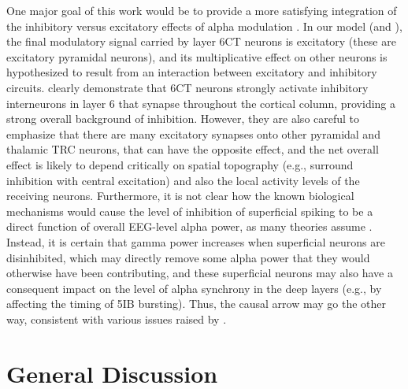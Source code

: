 \documentclass[11pt,twoside]{article}
\newif\myifpdf
\begin{document}
One major goal of this work would be to provide a more satisfying integration of the inhibitory versus excitatory effects of alpha modulation \cite{PalvaPalva11,PalvaPalva07,GulbinaiteIlhanVanRullen17}.  In our model (and ), the final modulatory signal carried by layer 6CT neurons is excitatory (these are excitatory pyramidal neurons), and its multiplicative effect on other neurons is hypothesized to result from an interaction between excitatory and inhibitory circuits.   clearly demonstrate that 6CT neurons strongly activate inhibitory interneurons in layer 6 that synapse throughout the cortical column, providing a strong overall background of inhibition.  However, they are also careful to emphasize that there are many excitatory synapses onto other pyramidal and thalamic TRC neurons, that can have the opposite effect, and the net overall effect is likely to depend critically on spatial topography (e.g., surround inhibition with central excitation) and also the local activity levels of the receiving neurons.  Furthermore, it is not clear how the known biological mechanisms would cause the level of inhibition of superficial spiking to be a direct function of overall EEG-level alpha power, as many theories assume \cite[e.g.,]{KlimeschSausengHanslmayr07,JensenGipsBergmannEtAl14}.  Instead, it is certain that gamma power increases when superficial neurons are disinhibited, which may directly remove some alpha power that they would otherwise have been contributing, and these superficial neurons may also have a consequent impact on the level of alpha synchrony in the deep layers (e.g., by affecting the timing of 5IB bursting).  Thus, the causal arrow may go the other way, consistent with various issues raised by .

\section{General Discussion}
\end{document}
